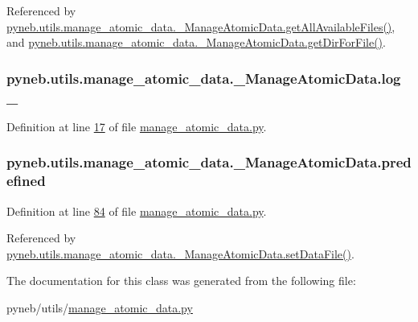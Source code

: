 Referenced by \hyperlink{manage__atomic__data_8py_source_l00190}{pyneb.\-utils.\-manage\-\_\-atomic\-\_\-data.\-\_\-\-Manage\-Atomic\-Data.\-get\-All\-Available\-Files()}, and \hyperlink{manage__atomic__data_8py_source_l00144}{pyneb.\-utils.\-manage\-\_\-atomic\-\_\-data.\-\_\-\-Manage\-Atomic\-Data.\-get\-Dir\-For\-File()}.

\hypertarget{classpyneb_1_1utils_1_1manage__atomic__data_1_1___manage_atomic_data_a1d8277ab92e8bac3e52ade094ba63773}{
\subsubsection[{log\-\_\-}]{\setlength{\rightskip}{0pt plus 5cm}pyneb.\-utils.\-manage\-\_\-atomic\-\_\-data.\-\_\-\-Manage\-Atomic\-Data.\-log\-\_\-}}\label{classpyneb_1_1utils_1_1manage__atomic__data_1_1___manage_atomic_data_a1d8277ab92e8bac3e52ade094ba63773}


Definition at line \hyperlink{manage__atomic__data_8py_source_l00017}{17} of file \hyperlink{manage__atomic__data_8py_source}{manage\-\_\-atomic\-\_\-data.\-py}.

\hypertarget{classpyneb_1_1utils_1_1manage__atomic__data_1_1___manage_atomic_data_a42d17444c105bd5238ae202a722ecb47}{
\subsubsection[{predefined}]{\setlength{\rightskip}{0pt plus 5cm}pyneb.\-utils.\-manage\-\_\-atomic\-\_\-data.\-\_\-\-Manage\-Atomic\-Data.\-predefined}}\label{classpyneb_1_1utils_1_1manage__atomic__data_1_1___manage_atomic_data_a42d17444c105bd5238ae202a722ecb47}


Definition at line \hyperlink{manage__atomic__data_8py_source_l00084}{84} of file \hyperlink{manage__atomic__data_8py_source}{manage\-\_\-atomic\-\_\-data.\-py}.



Referenced by \hyperlink{manage__atomic__data_8py_source_l00380}{pyneb.\-utils.\-manage\-\_\-atomic\-\_\-data.\-\_\-\-Manage\-Atomic\-Data.\-set\-Data\-File()}.



The documentation for this class was generated from the following file\-:\begin{DoxyCompactItemize}
\item 
pyneb/utils/\hyperlink{manage__atomic__data_8py}{manage\-\_\-atomic\-\_\-data.\-py}\end{DoxyCompactItemize}
